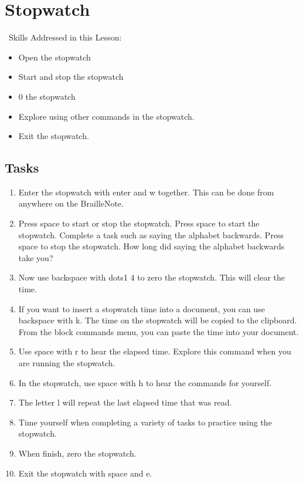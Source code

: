 \documentclass[10pt,letterpaper,twoside]{report}
\begin{document}
{{{%
\clearpage

\section{ Stopwatch}
\
Skills Addressed in this Lesson:
\begin{itemize}
	\item Open the stopwatch
	\item Start and stop the stopwatch
	\item 0 the stopwatch
	\item Explore using other commands in the stopwatch.
	\item Exit the stopwatch.
\end{itemize}

\subsection{Tasks}
\begin{enumerate}
	\item Enter the stopwatch with enter and w together.  This can be done from anywhere on the BrailleNote.
	\item Press space to start or stop the stopwatch.  Press space to start the stopwatch.  Complete a task such as saying the alphabet backwards.  Press space to stop the stopwatch.  How long did saying the alphabet backwards take you?
	\item Now use backspace with dots1 4 to zero the stopwatch.  This will clear the time.
	\item If you want to insert a stopwatch time into a document, you can use backspace with k.  The time on the stopwatch will be copied to the clipboard.  From the block commands menu, you can paste the time into your document.
	\item Use space with r to hear the elapsed time.  Explore this command when you are running the stopwatch.
	\item In the stopwatch, use space with h to hear the commands for yourself.
	\item The letter l will repeat the last elapsed time that was read.
	\item Time yourself when completing a variety of tasks to practice using the stopwatch.
	\item When finish, zero the stopwatch.
	\item Exit the stopwatch with space and e.
\end{enumerate}

}}}
\end{document}
